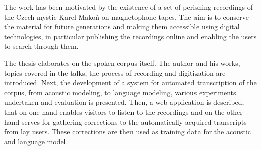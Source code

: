 The work has been motivated by the existence of a set of perishing recordings
of the Czech mystic Karel Makoň on magnetophone tapes. The aim is to conserve
the material for future generations and making them accessible using
digital technologies, in particular publishing the recordings online
and enabling the users to search through them.

The thesis elaborates on the spoken corpus itself. The
author and his works, topics covered in the talks, the process of recording
and digitization are introduced. Next, the development of a system for automated transcription of
the corpus, from acoustic modeling, to language modeling, various experiments
undertaken and evaluation is presented. Then, a web application is described,
that on one hand enables visitors to listen to the recordings and on the other
hand serves for gathering corrections to the automatically acquired transcripts from lay users.
These corrections are then used as training data for the acoustic and language
model.
